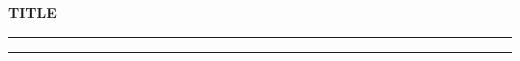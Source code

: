 \documentclass[11pt, oneside]{article}
\begin{document}
\begin{center}
    \vspace*{5cm}
    \LARGE\textbf{TITLE}\normalsize
\end{center}

\hrule
\vspace*{0.05cm}
\hrule

\newpage

\end{document}
